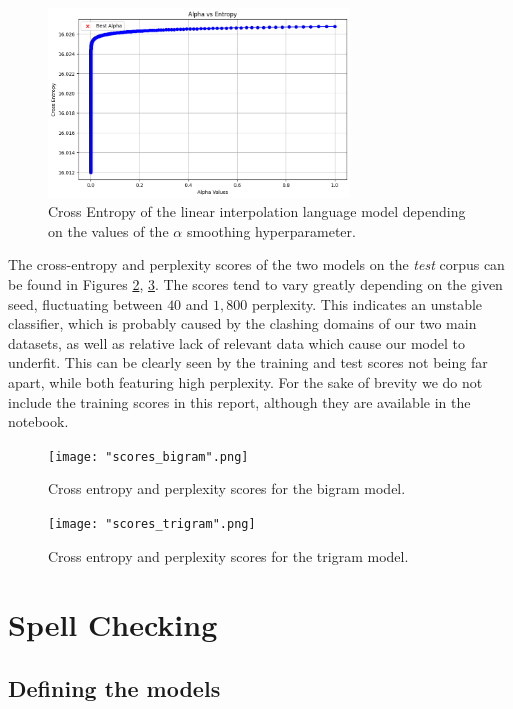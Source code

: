 \documentclass[11pt, a4paper]{article}
\begin{document}
	
	\begin{figure}
		\centering
		\includegraphics[width=8cm]{"interpolation_alpha.png"}
		\caption{Cross Entropy of the linear interpolation language model depending on the values of the $\alpha$ smoothing hyperparameter.}
		\label{fig::li_alpha_entropy}
	\end{figure}


	The cross-entropy and perplexity scores of the two models on the \textit{test} corpus can be found in Figures \ref{fig::scores_bigram}, \ref{fig::scores_trigram}. The scores tend to vary greatly depending on the given seed, fluctuating between $40$ and $1,800$ perplexity. This indicates an unstable classifier, which is probably caused by the clashing domains of our two main datasets, as well as relative lack of relevant data which cause our model to underfit. This can be clearly seen by the training and test scores not being far apart, while both featuring high perplexity. For the sake of brevity we do not include the training scores in this report, although they are available in the notebook.

	\begin{figure}
	    \centering
	    \texttt{[image: "scores\_bigram".png]}
	    \caption{Cross entropy and perplexity scores for the bigram model.}
	    \label{fig::scores_bigram}
	\end{figure}
	
	\begin{figure}
	    \centering
	    \texttt{[image: "scores\_trigram".png]}
	    \caption{Cross entropy and perplexity scores for the trigram model.}
	    \label{fig::scores_trigram}
	\end{figure}


	
	\section{Spell Checking}
	
	
	\subsection{Defining the models}
	
\end{document}
